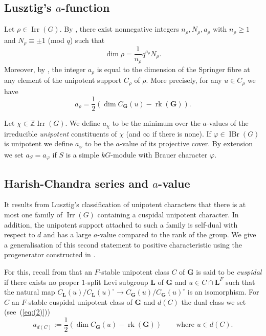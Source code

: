 \documentclass[12pt,leqno,a4paper]{amsart}
\newcommand{\ZZ}{\mathbb{Z}}
\newcommand{\bG}{{\mathbf{G}}}
\newcommand{\bL}{{\mathbf{L}}}
\newcommand{\rk}{{\operatorname{rk}}}
\newcommand{\IBr}{{\operatorname{IBr}}}
\newcommand{\Irr}{{\operatorname{Irr}}}
\let\vhi=\varphi
\theoremstyle{remark}
\begin{document}
\subsection{Lusztig's $a$-function}   \label{subsec:a-fun}
Let $\rho\in \Irr(G)$. By \cite[4.26.3]{LuB}, there exist nonnegative integers
$n_\rho, N_\rho, a_\rho$ with $n_\rho \geq 1$ and $N_\rho \equiv\pm1$ (mod $q$)
such that
$$ \dim \rho = \frac{1}{n_\rho} q^{a_\rho} N_\rho.$$
Moreover, by \cite[13.1.1]{LuB}, the integer $a_\rho$ is equal to the dimension
of the Springer fibre at any element of the unipotent support $C_\rho$ of
$\rho$. More precisely, for any $u \in C_\rho$ we have
\begin{equation}   \label{eq:(2)}
  a_\rho = \frac{1}{2}(\dim C_\bG(u) - \rk(\bG)).
  \end{equation}

Let $\chi\in\ZZ\Irr(G)$. We define $a_\chi$ to be the minimum over the
$a$-values of the irreducible \emph{unipotent} constituents of $\chi$ (and
$\infty$ if there is none). If
$\vhi\in\IBr(G)$ is unipotent we define $a_\vhi$ to be the $a$-value of its
projective cover. By extension we set $a_S = a_\vhi$ if $S$ is a simple
$kG$-module with Brauer character $\vhi$.

\subsection{Harish-Chandra series and $a$-value}
It results from Lusztig's classification of unipotent characters that there is
at most one family of $\Irr(G)$ containing a cuspidal unipotent character. In
addition, the unipotent support attached to such a family is self-dual with
respect to $d$ and has a large
$a$-value compared to the rank of the group. We give a generalisation of this
second statement to positive characteristic using the progenerator constructed
in \cite{DM17}.

For this, recall from \cite{GM96} that an $F$-stable unipotent class $C$ of
$\bG$ is said to be \emph{cuspidal} if there exists no proper $1$-split Levi
subgroup $\bL$ of $\bG$ and $u \in C \cap \bL^F$ such that the natural map
$C_\bL(u)/C_\bL(u)^\circ \rightarrow C_\bG(u)/C_\bG(u)^\circ$ is an isomorphism.
For $C$ an $F$-stable cuspidal unipotent class of $\bG$ and $d(C)$ the dual
class we set (see~(\ref{eq:(2)}))
$$a_{d(C)} := \frac{1}{2}(\dim C_\bG(u) - \rk(\bG))\qquad
  \text{where $u \in d(C)$}.$$
\end{document}
